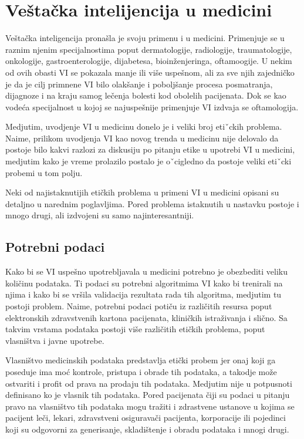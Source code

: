 \documentclass[a4paper]{article}
\begin{document}
\section{Veštačka intelijencija u medicini}
\label{sec:upotreba_veštačke_intelijencije_u_medicini}

Veštačka inteligencija pronašla je svoju primenu i u medicini. Primenjuje se u raznim njenim specijalnostima poput dermatologije, radiologije, traumatologije, onkologije, gastroenterologije, dijabetesa, bioinženjeringa, oftamoogije. U nekim od ovih obasti VI se pokazala manje ili više uspešnom, ali za sve njih zajedničko je da je cilj primnene VI bilo olakšanje i poboljšanje procesa  posmatranja, dijagnoze i na kraju samog lečenja bolesti kod obolelih pacijenata. Dok se kao vodeća specijalnost u kojoj se najuspešnije primenjuje VI izdvaja se oftamologija.

Medjutim, uvodjenje VI u medicinu donelo je i veliki broj etiˇckih problema. Naime, prilikom uvodjenja VI kao novog trenda u medicinu nije delovalo da postoje bilo kakvi razlozi za diskusiju po pitanju etike u upotrebi VI u medicini, medjutim kako je vreme prolazilo postalo je oˇcigledno da postoje veliki etiˇcki probemi u tom polju.

Neki od najistaknutijih etičkih problema u primeni VI u medicini opisani su detaljno u narednim poglavljima. Pored problema istaknutih u nastavku postoje i mnogo drugi, ali izdvojeni su samo najinteresantniji.

\subsection{Potrebni podaci}
\label{subsec:poreklo_podataka}

Kako bi se VI uspešno upotrebljavala u medicini potrebno je obezbediti veliku količinu podataka. Ti podaci su potrebni algoritmima VI kako bi trenirali na njima i kako bi se vršila validacija rezultata rada tih algoritma, medjutim tu postoji problem. Naime, potrebni podaci potiču iz različitih resursa poput elektronskih zdravstvenih kartona pacijenata, kliničkih istraživanja i slično. Sa takvim vrstama podataka postoji više različitih etičkih problema, poput vlasništva i javne upotrebe.

Vlasništvo medicinskih podataka predstavlja etički probem jer onaj koji ga poseduje ima moć kontrole, pristupa i obrade tih podataka, a takodje može ostvariti i profit od prava na prodaju tih podataka. Medjutim nije u potpusnoti definisano ko je vlasnik tih podataka. Pored pacijenata čiji su podaci u pitanju pravo na vlasništvo tih podataka mogu tražiti i zdrastvene ustanove u kojima se pacijent leči, lekari, zdravstveni osiguravači pacijenta, korporacije ili pojedinci koji su odgovorni za generisanje, skladištenje i obradu podataka i mnogi drugi.
\end{document}

